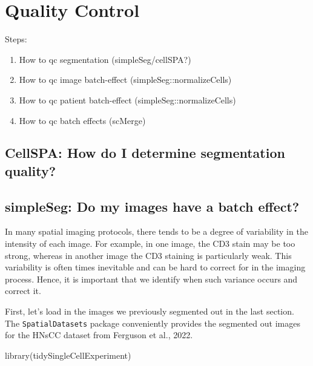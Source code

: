 \documentclass[
  letterpaper,
  DIV=11,
  numbers=noendperiod]{scrreprt}
\newenvironment{Shaded}{\begin{snugshade}}{\end{snugshade}}
\newcommand{\FunctionTok}[1]{\textcolor[rgb]{0.28,0.35,0.67}{#1}}
\newcommand{\NormalTok}[1]{\textcolor[rgb]{0.00,0.23,0.31}{#1}}
\providecommand{\tightlist}{%
  \setlength{\itemsep}{0pt}\setlength{\parskip}{0pt}}\usepackage{longtable,booktabs,array}
\begin{document}

\chapter{Quality Control}\label{quality-control}

Steps:

\begin{enumerate}
\def\labelenumi{\arabic{enumi}.}
\tightlist
\item
  How to qc segmentation (simpleSeg/cellSPA?)
\item
  How to qc image batch-effect (simpleSeg::normalizeCells)
\item
  How to qc patient batch-effect (simpleSeg::normalizeCells)
\item
  How to qc batch effects (scMerge)
\end{enumerate}

\section{CellSPA: How do I determine segmentation
quality?}\label{cellspa-how-do-i-determine-segmentation-quality}

\section{simpleSeg: Do my images have a batch
effect?}\label{simpleseg-do-my-images-have-a-batch-effect}

In many spatial imaging protocols, there tends to be a degree of
variability in the intensity of each image. For example, in one image,
the CD3 stain may be too strong, whereas in another image the CD3
staining is particularly weak. This variability is often times
inevitable and can be hard to correct for in the imaging process. Hence,
it is important that we identify when such variance occurs and correct
it.

First, let's load in the images we previously segmented out in the last
section. The \texttt{SpatialDatasets} package conveniently provides the
segmented out images for the HNsCC dataset from Ferguson et al., 2022.

\begin{Shaded}
\begin{Highlighting}[]
\FunctionTok{library}\NormalTok{(tidySingleCellExperiment)}
\end{Highlighting}
\end{Shaded}
\end{document}
